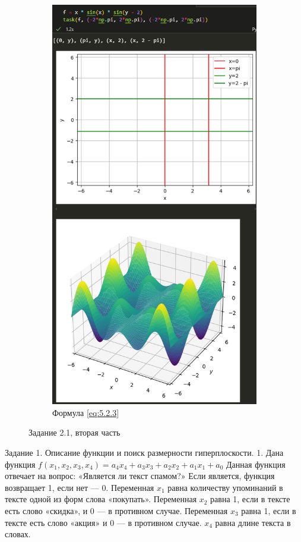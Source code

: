 \documentclass[14pt,a4paper]{extarticle}
\begin{document}
\begin{figure}
\begin{subfigure}{0.48\linewidth}
        \includegraphics[width=0.95\linewidth]{figures/5.2/1.3.png}
        \caption{Формула \ref{eq:5.2.3}}
        \label{pic:5.2.3}
    \end{subfigure}
    \caption{Задание 2.1, вторая часть}
\end{figure}

Задание 1. Описание функции и поиск размерности
гиперплоскости.
1. Дана функция \(f(x_1, x_2, x_3, x_4) = a_4 x_4 + a_3 x_3 + a_2 x_2 + a_1 x_1 + a_0\)
Данная функция отвечает на вопрос: «Является ли текст спамом?»
Если является, функция возвращает 1, если нет — 0. Переменная
$x_1$ равна количеству упоминаний в тексте одной из форм слова 
«покупать». Переменная $x_2$ равна 1, если в тексте есть слово
«скидка», и 0 — в противном случае. Переменная $x_3$ равна 1,
если в тексте есть слово «акция» и 0 — в противном случае.
$x_4$ равна длине текста в словах.
\end{document}

